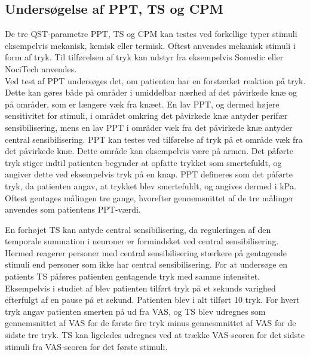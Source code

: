 \subsection{Undersøgelse af PPT, TS og CPM}
   
De tre QST-parametre PPT, TS og CPM kan testes ved forkellige typer stimuli eksempelvis mekanisk, kemisk eller termisk. Oftest anvendes mekanisk stimuli i form af tryk. \citep{Suokas2012} Til tilførelsen af tryk kan udstyr fra eksempelvis Somedic eller NociTech anvendes. \citep{Wylde2015} \citep{Petersen2016} \\
Ved test af PPT undersøges det, om patienten har en forstærket reaktion på tryk. Dette kan gøres både på områder i umiddelbar nærhed af det påvirkede knæ og på områder, som er længere væk fra knæet. En lav PPT, og dermed højere sensitivitet for stimuli, i området omkring det påvirkede knæ antyder perifær sensibilisering, mens en lav PPT i områder væk fra det påvirkede knæ antyder central sensibilisering. \citep{Suokas2012} PPT kan testes ved tilførelse af tryk på et område væk fra det påvirkede knæ. Dette område kan eksempelvis være på armen. Det påførte tryk stiger indtil patienten begynder at opfatte trykket som smertefuldt, og angiver dette ved eksempelvis tryk på en knap. PPT defineres som det påførte tryk, da patienten angav, at trykket blev smertefuldt, og angives dermed i kPa. Oftest gentages målingen tre gange, hvorefter gennemsnittet af de tre målinger anvendes som patientens PPT-værdi. \citep{Petersen2015b} \citep{Wylde2015} 

En forhøjet TS kan antyde central sensibilisering, da reguleringen af den temporale summation i neuroner er formindsket ved central sensibilisering. Hermed reagerer personer med central sensibilisering stærkere på gentagende stimuli end personer som ikke har central sensibilisering. \citep{Arendt-Nielsen2015} For at undersøge en patients TS påføres patienten gentagende tryk med samme intensitet. Eksempelvis i studiet af \citep{Petersen2016} blev patienten tilført tryk på et sekunds varighed efterfulgt af en pause på et sekund. Patienten blev i alt tilført 10 tryk. For hvert tryk angav patienten smerten på ud fra VAS, og TS blev udregnes som gennemsnittet af VAS for de første fire tryk minus gennesmnittet af VAS for de sidste tre tryk. \citep{Petersen2016} TS kan ligeledes udregnes ved at trække VAS-scoren for det sidste stimuli fra VAS-scoren for det første stimuli. \citep{Petersen2015b} 

